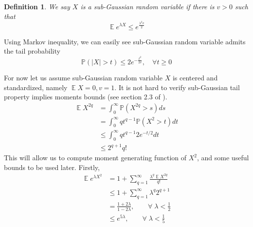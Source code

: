 \documentclass[12pt]{extarticle}
\newtheorem{definition}[other]{Definition}
\newcommand{\field}[1]{\mathbb{#1}}
\newcommand{\R}{\field{R}}
\newcommand{\1}{\field{1}}
\newcommand{\p}{\field{P}}
\DeclareMathOperator{\E}{\mathbb{E}}
\numberwithin{equation}{section}
\begin{document}
\begin{definition}
We say $X$  is a sub-Gaussian random variable if there is $v>0$ such that  
\[
\E e^{\lambda X} \le e^{\frac{\lambda^2v}{2}}
\]
\end{definition}
Using Markov inequality, we can easily see sub-Gaussian random variable admits the tail probability
$$ \p(|X|>t)\le 2 e^{-\frac{t^2}{2v}}, \quad \forall t \ge 0 $$

For now let us assume sub-Gaussian random variable $X$ is centered and standardized, namely $\E X=0, v=1$. It is not hard to verify sub-Gaussian tail property implies moments bounds (see section 2.3 of \cite{ boucheron2013concentration}). 
\begin{align*}
    \E X^{2q} & =\int_0^{\infty} \p(X^{2q}>s) ds \\
    & = \int_0^{\infty} q t^{q-1}\p(X^{2}>t) dt \\
    &\le \int_0^{\infty} q t^{q-1} 2 e^{-t/2} dt \\
    &\le 2^{q+1} q!
\end{align*}
This will allow us to compute moment generating function of $X^2$, and some useful bounds to be used later. Firstly,
\begin{align}\label{eqn:sub-gaussian square exp-moment bound noncenter}
    \E e^{\lambda X^2} 
   & = 1+ \sum_{q=1}^{\infty} \frac{\lambda^{q} \E X^{2q} }{q!} \nonumber \\
   & \le 1+ \sum_{q=1}^{\infty} \lambda^{q} 2^{q+1} \nonumber \\
   & = \frac{1+2\lambda}{1-2\lambda}, \qquad  \forall \; \lambda< \frac{1}{2} \nonumber \\
   &\le e^{5\lambda}, \qquad  \forall \; \lambda< \frac{1}{5}
\end{align}
\end{document}
